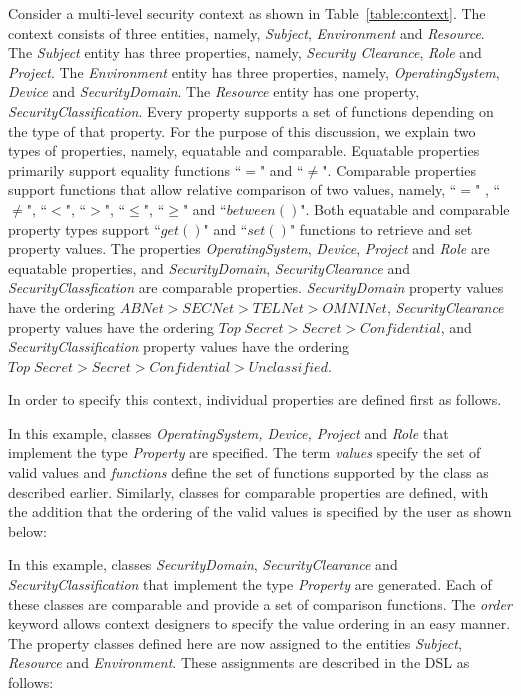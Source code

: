 Consider a multi-level security context as shown in Table~\ref{table:context}. The context consists of three entities, namely, {\em Subject}, {\em Environment} and {\em Resource}. The {\em Subject} entity has three properties, namely, {\em Security Clearance}, {\em Role} and {\em Project}.  The {\em Environment} entity has three properties, namely, {\em OperatingSystem}, {\em Device} and {\em SecurityDomain}.  The {\em Resource} entity has one property, {\em SecurityClassification}. Every property supports a set of functions depending on the type of that property.  For the purpose of this discussion, we explain two types of properties, namely, equatable and comparable.  Equatable properties primarily support equality functions  ``$=$" and ``$\ne$". Comparable properties support functions that allow relative comparison of two values, namely, ``$=$" , ``$\ne$", ``$<$", ``$>$",  ``$\leq$", ``$\geq$" and ``$between()$". Both equatable and comparable property types support ``$get()$" and ``$set()$" functions to retrieve and set property values. The properties {\em OperatingSystem}, {\em Device}, {\em Project} and {\em Role} are equatable properties, and {\em SecurityDomain}, {\em SecurityClearance} and {\em SecurityClassfication} are comparable properties. {\em SecurityDomain} property values have the ordering $ABNet > SECNet > TELNet > OMNINet$,  {\em SecurityClearance} property values have the ordering $Top\;Secret > Secret > Confidential$, and {\em SecurityClassification} property values have the ordering $Top\;Secret > Secret > Confidential > Unclassified$. 

In order to specify this context, individual properties are defined first as follows. 


	
In this example, classes  {\em OperatingSystem, Device, Project} and {\em Role} that implement the type {\em Property} are specified. The term {\em values} specify the set of valid values and {\em functions} define the set of functions supported by the class as described earlier. Similarly, classes for comparable properties are defined, with the addition that the ordering of the valid values is specified by the user as shown below: 



In this example, classes {\em SecurityDomain}, {\em SecurityClearance} and {\em SecurityClassification} that implement the type {\em Property} are generated. Each of these classes are comparable and provide a set of comparison functions. The {\em order} keyword allows context designers to specify the value ordering in an easy manner. The property classes defined here are now assigned to the entities {\em Subject}, {\em Resource} and {\em Environment}. These assignments are described in the DSL as follows: 

